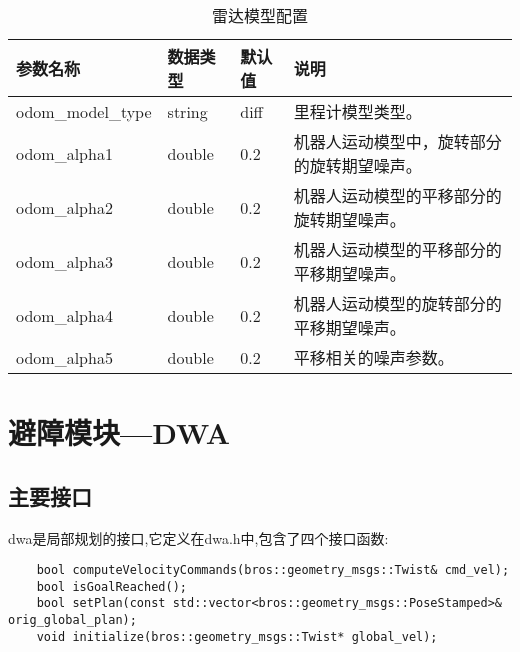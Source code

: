 \begin{table}[th]
  \caption{雷达模型配置}  
  \begin{center}  
  \begin{tabular}{|p{4.5cm}|p{1.1cm}|l|p{6cm}|}  
  \hline  
  参数名称 & 数据类型 & 默认值 & 说明  \\ \hline  
  odom\_model\_type & string & diff & 里程计模型类型。 \\  \hline  
  odom\_alpha1 & double & 0.2 & 机器人运动模型中，旋转部分的旋转期望噪声。 \\  \hline  
  odom\_alpha2 & double & 0.2 & 机器人运动模型的平移部分的旋转期望噪声。 \\  \hline  
  odom\_alpha3 & double & 0.2 & 机器人运动模型的平移部分的平移期望噪声。 \\  \hline  
  odom\_alpha4 & double & 0.2 & 机器人运动模型的旋转部分的平移期望噪声。 \\  \hline  
  odom\_alpha5 & double & 0.2 & 平移相关的噪声参数。 \\  \hline  

  \end{tabular}  
  \end{center}  
  \end{table} 

  \chapter{避障模块---DWA}

  \section{主要接口}

  dwa是局部规划的接口,它定义在dwa.h中,包含了四个接口函数:

  \begin{lstlisting}
    bool computeVelocityCommands(bros::geometry_msgs::Twist& cmd_vel);
    bool isGoalReached();
    bool setPlan(const std::vector<bros::geometry_msgs::PoseStamped>& orig_global_plan);
    void initialize(bros::geometry_msgs::Twist* global_vel);
  \end{lstlisting}

